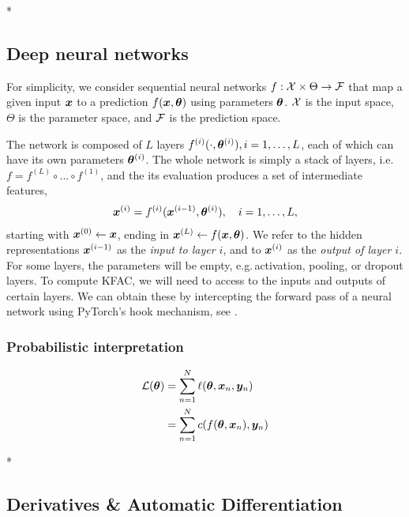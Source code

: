 
\switchcolumn[1]*
\switchcolumn[0]

\subsection{Deep neural networks}

For simplicity, we consider sequential neural networks $f: {\mathcal{X}} \times \Theta \to {\mathcal{F}}$ that map a given input ${\bm{x}}$ to a prediction $f({\bm{x}}, {\bm{\theta}})$ using parameters ${\bm{\theta}}$.
${\mathcal{X}}$ is the input space, $\Theta$ is the parameter space, and ${\mathcal{F}}$ is the prediction space.

The network is composed of $L$ layers $f^{(i)}(\cdot, {\bm{\theta}}^{(i)}), i=1,\dots, L$, each of which can have its own parameters ${\bm{\theta}}^{(i)}$.
The whole network is simply a stack of layers, i.e.
$f = f^{(L)} \circ \dots \circ f^{(1)}$, and the its evaluation produces a set of intermediate features,
\begin{align*}
  {\bm{x}}^{(i)} = f^{(i)}({\bm{x}}^{(i-1)}, {\bm{\theta}}^{(i)}), \quad i=1,\dots, L,
\end{align*}
starting with ${\bm{x}}^{(0)} \leftarrow {\bm{x}}$, ending in ${\bm{x}}^{(L)} \leftarrow f({\bm{x}}, {\bm{\theta}})$.
We refer to the hidden representations ${\bm{x}}^{(i-1)}$ as the \emph{input to layer $i$}, and to ${\bm{x}}^{(i)}$ as the \emph{output of layer $i$}.
For some layers, the parameters will be empty, e.g.\,activation, pooling, or dropout layers.
To compute KFAC, we will need to access to the inputs and outputs of certain layers.
We can obtain these by intercepting the forward pass of a neural network using PyTorch's hook mechanism, see .

\subsubsection{Probabilistic interpretation}


\begin{align}
  {\mathcal{L}}({\bm{\theta}}) &= \sum_{n=1}^N \ell({\bm{\theta}}, {\bm{x}}_n, {\bm{y}}_n)
  \\
               &=
                 \sum_{n=1}^N c(f({\bm{\theta}}, {\bm{x}}_n), {\bm{y}}_n)
\end{align}

\switchcolumn[0]

\switchcolumn[1]

\switchcolumn[0]* %

\subsection{Derivatives \& Automatic Differentiation}

